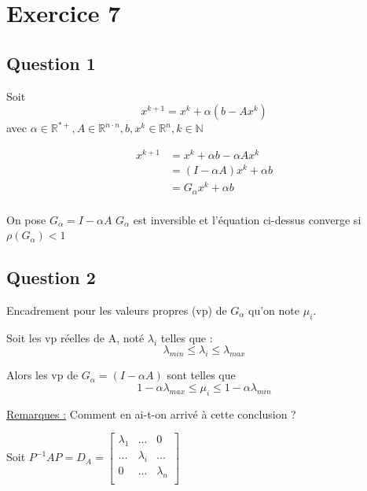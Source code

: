 \documentclass[11pt]{article}
\begin{document}
\section{Exercice 7}

\subsection{Question 1}

Soit $$x^{k + 1} = x^k + \alpha (b - Ax^k)$$
avec $\alpha \in \mathbb{R}^{*+}, A \in \mathbb{R}^{n \cdot n}, b, x^k
\in \mathbb{R}^n, k \in \mathbb{N}$\newline

\begin{equation*}
  \begin{split}
    x^{k+1} & = x^k + \alpha b - \alpha A x^k \\
    & = (I - \alpha A) x^k + \alpha b \\
    & = G_{\alpha} x^k + \alpha b \\
  \end{split}
\end{equation*}

On pose $G_{\alpha} = I - \alpha A$\newline
\vspace{5mm}
$G_{\alpha}$ est inversible et l'équation ci-dessus converge si
$\rho(G_{\alpha}) < 1$

\subsection{Question 2}

Encadrement pour les valeurs propres (vp) de $G_{\alpha}$ qu'on note
$\mu_i$.\newline

\vspace{5mm}

Soit les vp réelles de A, noté $\lambda_i$ telles que :
$$ \lambda_{min} \le \lambda_i \le \lambda_{max} $$

Alors les vp de $G_{\alpha} = (I - \alpha A)$ sont telles  que
$$ 1 - \alpha \lambda_{max} \le \mu_i \le 1 - \alpha \lambda_{min}$$

\underline{Remarques :} Comment en ai-t-on arrivé à cette conclusion ?\newline

\vspace{5mm}

Soit $P^{-1}AP = D_A = \left[
  \begin{array}{ccc}
    \lambda_1 & ... & 0 \\
    ... & \lambda_i & ... \\
    0 & ... & \lambda_n \\
  \end{array}
  \right]$
\end{document}
